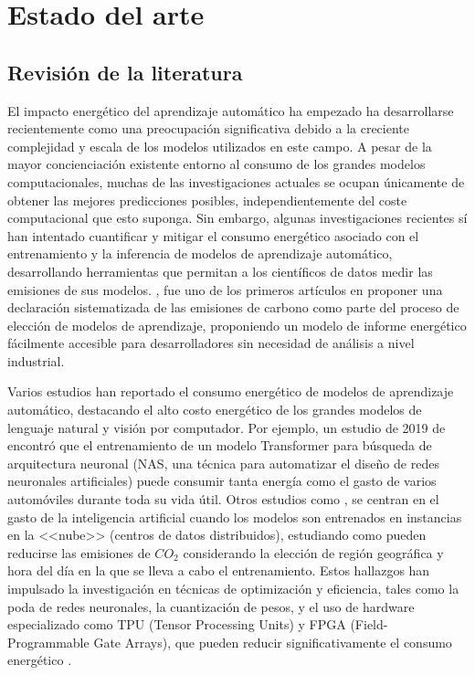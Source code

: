 \chapter{Estado del arte}
\label{chap:sota}

\section{Revisión de la literatura}
\label{sec:lit-rev}


El impacto energético del aprendizaje automático ha empezado ha desarrollarse recientemente como una preocupación significativa debido a la creciente complejidad y escala de los modelos utilizados en este campo. A pesar de la mayor concienciación existente entorno al consumo de los grandes modelos computacionales, muchas de las investigaciones actuales se ocupan únicamente de obtener las mejores predicciones posibles, independientemente del coste computacional que esto suponga. Sin embargo, algunas investigaciones recientes sí han intentado cuantificar y mitigar el consumo energético asociado con el entrenamiento y la inferencia de modelos de aprendizaje automático, desarrollando herramientas que permitan a los científicos de datos medir las emisiones de sus modelos. \citeauthor{lottick2019}, \citeyear{lottick2019} \cite{lottick2019} fue uno de los primeros artículos en proponer una declaración sistematizada de las emisiones de carbono como parte del proceso de elección de modelos de aprendizaje, proponiendo un modelo de informe energético fácilmente accesible para desarrolladores sin necesidad de análisis a nivel industrial.

Varios estudios han reportado el consumo energético de modelos de aprendizaje automático, destacando el alto costo energético de los grandes modelos de lenguaje natural y visión por computador. Por ejemplo, un estudio de 2019 de \citeauthor{strubell2019nlp} \cite{strubell2019nlp} encontró que el entrenamiento de un modelo Transformer para búsqueda de arquitectura neuronal (NAS, una técnica para automatizar el diseño de redes neuronales artificiales) puede consumir tanta energía como el gasto de varios automóviles durante toda su vida útil. Otros estudios como \citeauthor{dodge2022cloud}, \citeyear{dodge2022cloud} \cite{dodge2022cloud} se centran en el gasto de la inteligencia artificial cuando los modelos son entrenados en instancias en la <<nube>> (centros de datos distribuidos), estudiando como pueden reducirse las emisiones de $CO_2$ considerando la elección de región geográfica y hora del día en la que se lleva a cabo el entrenamiento. Estos hallazgos han impulsado la investigación en técnicas de optimización y eficiencia, tales como la poda de redes neuronales, la cuantización de pesos, y el uso de hardware especializado como TPU (Tensor Processing Units) y FPGA (Field-Programmable Gate Arrays), que pueden reducir significativamente el consumo energético \cite{goel2020survey}.

